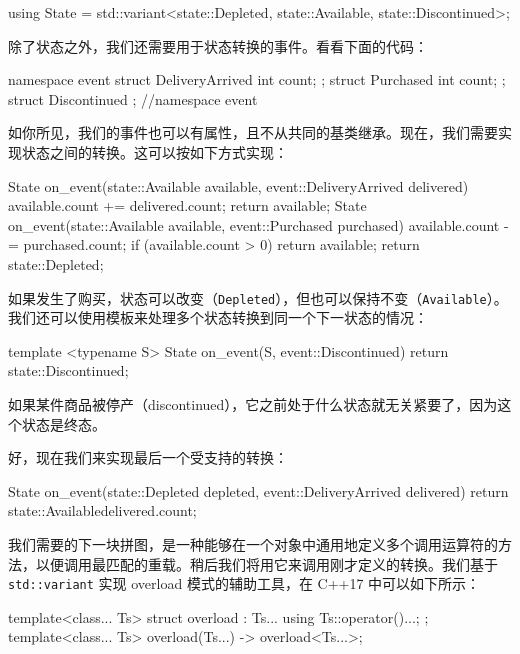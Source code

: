 \begin{codebox}[cpp]
using State = std::variant<state::Depleted, state::Available, state::Discontinued>;
\end{codebox}

\label{idx:591}
除了状态之外，我们还需要用于状态转换的事件。看看下面的代码：

\begin{codebox}[cpp]
namespace event {
struct DeliveryArrived {
    int count;
};
struct Purchased {
    int count;
};
struct Discontinued {};
} //namespace event
\end{codebox}

如你所见，我们的事件也可以有属性，且不从共同的基类继承。现在，我们需要实现状态之间的转换。这可以按如下方式实现：

\begin{codebox}[text]
State on_event(state::Available available, event::DeliveryArrived delivered) {
    available.count += delivered.count;
    return available;
}
State on_event(state::Available available, event::Purchased purchased) {
    available.count -= purchased.count;
    if (available.count > 0)
        return available;
    return state::Depleted{};
}
\end{codebox}

如果发生了购买，状态可以改变（\texttt{Depleted}），但也可以保持不变（\texttt{Available}）。我们还可以使用模板来处理多个状态转换到同一个下一状态的情况：

\begin{codebox}[cpp]
template <typename S> State on_event(S, event::Discontinued) {
    return state::Discontinued{};
}
\end{codebox}

\label{idx:592}
如果某件商品被停产（discontinued），它之前处于什么状态就无关紧要了，因为这个状态是终态。

好，现在我们来实现最后一个受支持的转换：

\begin{codebox}[text]
State on_event(state::Depleted depleted, event::DeliveryArrived delivered) {
    return state::Available{delivered.count};
}
\end{codebox}

\label{idx:593}
我们需要的下一块拼图，是一种能够在一个对象中通用地定义多个调用运算符的方法，以便调用最匹配的重载。稍后我们将用它来调用刚才定义的转换。我们基于 \texttt{std::\allowbreak{}variant} 实现 overload 模式的辅助工具，在 C++17 中可以如下所示：

\begin{codebox}[cpp]
template<class... Ts>
struct overload : Ts... {
    using Ts::operator()...;
};
template<class... Ts>
overload(Ts...) -> overload<Ts...>;
\end{codebox}

